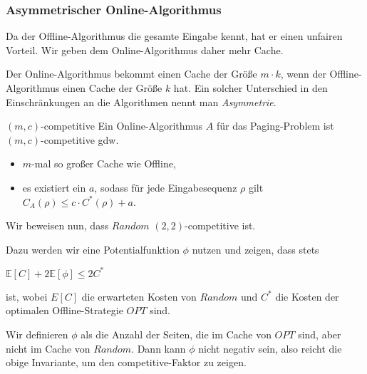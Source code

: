 \documentclass{panikzettel}
\begin{document}
\subsubsection{Asymmetrischer Online-Algorithmus}
\begin{halfboxl}
Da der Offline-Algorithmus die gesamte Eingabe kennt, hat er einen unfairen Vorteil. Wir geben dem Online-Algorithmus daher mehr Cache.

Der Online-Algorithmus bekommt einen Cache der Größe $m \cdot k$, wenn der Offline-Algorithmus einen Cache der Größe $k$ hat. Ein solcher Unterschied in den Einschränkungen an die Algorithmen nennt man \emph{Asymmetrie}.
\end{halfboxl}%
\begin{halfboxr}
\vspace{-\baselineskip}
\begin{defi}{$(m,c)$-competitive}
    Ein Online-Algorithmus $A$ für das Paging-Problem ist $(m,c)$-competitive gdw.
    \begin{itemize}[leftmargin=*]
        \item $m$-mal so großer Cache wie Offline,
        \item es existiert ein $a$, sodass für jede Eingabesequenz $\rho$ gilt $C_A(\rho) \leq c \cdot C^*(\rho)+a$.
    \end{itemize}
\end{defi}
\end{halfboxr}
\vspace{-\baselineskip}

Wir beweisen nun, dass $Random$ $(2,2)$-competitive ist.

Dazu werden wir eine Potentialfunktion $\phi$ nutzen und zeigen, dass stets
\begin{tightcenter}
$\mathbb{E}[C] + 2\mathbb{E}[\phi] \le 2 C^\ast$
\end{tightcenter}
ist, wobei $E[C]$ die erwarteten Kosten von $Random$ und $C^\ast$ die Kosten der optimalen Offline-Strategie $OPT$ sind.

Wir definieren $\phi$ als die Anzahl der Seiten, die im Cache von $OPT$ sind, aber nicht im Cache von $Random$. Dann kann $\phi$ nicht negativ sein, also reicht die obige Invariante, um den competitive-Faktor zu zeigen.
\end{document}
